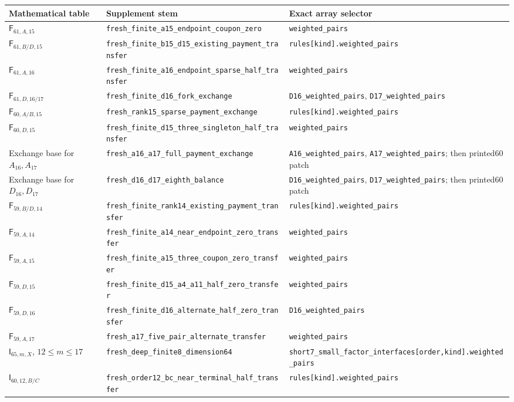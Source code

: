 \documentclass[11pt]{article}
\theoremstyle{remark}\newtheorem{remark}[theorem]{Remark}
\newcommand{\cert}[1]{\nolinkurl{#1}}
\begin{document}
{\scriptsize
\begin{longtable}{@{}p{}p{}p{}@{}}
\toprule Mathematical table&Supplement stem&Exact array selector\\\midrule
\endhead
$\mathsf F_{61,A,15}$&\cert{fresh_finite_a15_endpoint_coupon_zero}&\cert{weighted_pairs}\\
$\mathsf F_{61,B/D,15}$&\cert{fresh_finite_b15_d15_existing_payment_transfer}&\cert{rules[kind].weighted_pairs}\\
$\mathsf F_{61,A,16}$&\cert{fresh_finite_a16_endpoint_sparse_half_transfer}&\cert{weighted_pairs}\\
$\mathsf F_{61,D,16/17}$&\cert{fresh_finite_d16_fork_exchange}&\cert{D16_weighted_pairs}, \cert{D17_weighted_pairs}\\
$\mathsf F_{60,A/B,15}$&\cert{fresh_rank15_sparse_payment_exchange}&\cert{rules[kind].weighted_pairs}\\
$\mathsf F_{60,D,15}$&\cert{fresh_finite_d15_three_singleton_half_transfer}&\cert{weighted_pairs}\\
Exchange base for$A_{16},A_{17}$&\cert{fresh_a16_a17_full_payment_exchange}&\cert{A16_weighted_pairs}, \cert{A17_weighted_pairs}; then printed60 patch\\
Exchange base for$D_{16},D_{17}$&\cert{fresh_d16_d17_eighth_balance}&\cert{D16_weighted_pairs}, \cert{D17_weighted_pairs}; then printed60 patch\\
$\mathsf F_{59,B/D,14}$&\cert{fresh_finite_rank14_existing_payment_transfer}&\cert{rules[kind].weighted_pairs}\\
$\mathsf F_{59,A,14}$&\cert{fresh_finite_a14_near_endpoint_zero_transfer}&\cert{weighted_pairs}\\
$\mathsf F_{59,A,15}$&\cert{fresh_finite_a15_three_coupon_zero_transfer}&\cert{weighted_pairs}\\
$\mathsf F_{59,D,15}$&\cert{fresh_finite_d15_a4_a11_half_zero_transfer}&\cert{weighted_pairs}\\
$\mathsf F_{59,D,16}$&\cert{fresh_finite_d16_alternate_half_zero_transfer}&\cert{D16_weighted_pairs}\\
$\mathsf F_{59,A,17}$&\cert{fresh_a17_five_pair_alternate_transfer}&\cert{weighted_pairs}\\
$\mathsf I_{65,m,X}$, $12\le m\le17$&\cert{fresh_deep_finite8_dimension64}&\cert{short7_small_factor_interfaces[order,kind].weighted_pairs}\\
$\mathsf I_{60,12,B/C}$&\cert{fresh_order12_bc_near_terminal_half_transfer}&\cert{rules[kind].weighted_pairs}\\

\end{longtable}}
\end{document}
